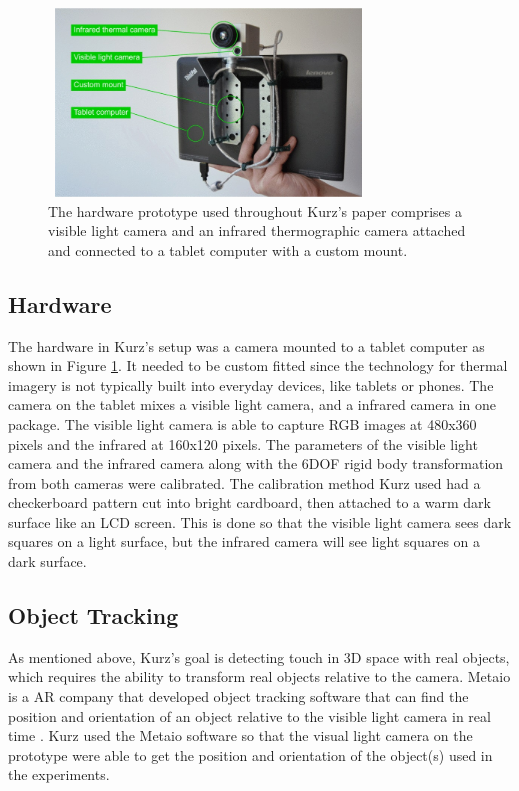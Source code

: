 \documentclass{sig-alternate}
\begin{document}
\begin{figure}
	\includegraphics[width=8.5cm, height=5cm]{Hardware2}
	\caption{The hardware prototype used throughout Kurz's paper comprises a visible light camera and an infrared thermographic camera attached and connected to a tablet computer with a custom mount. \cite{Thermal}}
	\label{fig:hardware}
\end{figure}

\subsection{Hardware}
\label{Hardware}
The hardware in Kurz's \cite{Thermal} setup was a camera mounted to a tablet computer as shown in Figure \ref{fig:hardware}. It needed to be custom fitted since the technology for thermal imagery is not typically built into everyday devices, like tablets or phones. The camera on the tablet mixes a visible light camera, and a infrared camera in one package. The visible light camera is able to capture RGB images at 480x360 pixels and the infrared at 160x120 pixels. The parameters of the visible light camera and the infrared camera along with the 6DOF rigid body transformation from both cameras were calibrated. The calibration method Kurz used had a checkerboard pattern cut into bright cardboard, then attached to a warm dark surface like an LCD screen. This is done so that the visible light camera sees dark squares on a light surface, but the infrared camera will see light squares on a dark surface. 


\subsection{Object Tracking}
\label{Object Tracking}
As mentioned above,  Kurz's goal is detecting touch in 3D space with real objects, which requires the ability to transform real objects relative to the camera. Metaio is a AR company that developed object tracking software that can find the position and orientation of an object relative to the visible light camera in real time \cite{Thermal}. Kurz used the Metaio software so that the visual light camera on the prototype were able to get the position and orientation of the object(s) used in the experiments.     
\end{document}
